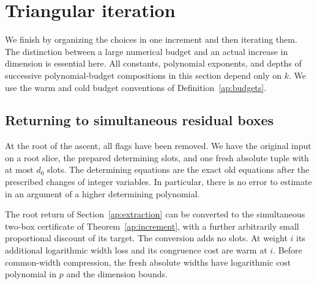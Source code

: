 \section{Triangular iteration}\label{ap:iteration}

We finish by organizing the choices in one increment and then iterating them.
The distinction between a large numerical budget and an actual increase in
dimension is essential here.  All constants, polynomial exponents, and
depths of successive polynomial-budget compositions in this section
depend only on $k$.  We use the warm and cold budget conventions of
Definition~\ref{ap:budgets}.

\subsection{Returning to simultaneous residual boxes}

At the root of the ascent, all flags have been removed.  We have the original
input on a root slice, the prepared determining slots, and one fresh absolute
tuple with at most $d_0$ slots.  The determining equations are the exact old
equations after the prescribed changes of integer variables.  In particular,
there is no error to estimate in an argument of a higher determining
polynomial.

\begin{lemma}\label{ap:iteration:compression}
The root return of Section~\ref{ap:extraction} can be converted to the
simultaneous two-box certificate of Theorem~\ref{ap:increment}, with a
further arbitrarily small proportional discount of its target.
The conversion adds no slots.  At weight $i$ its additional logarithmic
width loss and its congruence cost are warm at $i$.  Before common-width
compression, the fresh absolute widths have logarithmic cost polynomial
in $p$ and the dimension bounds.
\end{lemma}

